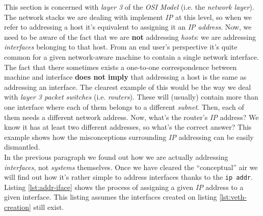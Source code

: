         This section is concerned with \textit{layer 3} of the \textit{OSI Model} (i.e. the \textit{network layer}). The network stacks we are dealing with implement \textit{IP} at this level, so when we refer to addressing a host it's equivalent to assigning it an \textit{IP address}. Now, we need to be aware of the fact that we are \textbf{not} addressing \textit{hosts}: we are addressing \textit{interfaces} belonging to that host. From an end user's perspective it's quite common for a given network-aware machine to contain a single network interface. The fact that there sometimes exists a one-to-one correspondence between machine and interface \textbf{does not imply} that addressing a host is the same as addressing an interface. The clearest example of this would be the way we deal with \textit{layer 3 packet switches} (i.e. \textit{routers}). These will (usually) contain more than one interface where each of them belongs to a different \textit{subnet}. Then, each of them needs a different network address. Now, what's the router's \textit{IP} address? We know it has at least two different addresses, so what's the correct answer? This example shows how the misconceptions surrounding \textit{IP} addressing can be easily dismantled.\\

        In the previous paragraph we found out how we are actually addressing \textit{interfaces}, not \textit{systems} themselves. Once we have cleared the ``conceptual'' air we will find out how it's rather simple to address interfaces thanks to the \texttt{ip addr}. Listing \ref{lst:addr-iface} shows the process of assigning a given \textit{IP} address to a given interface. This listing assumes the interfaces created on listing \ref{lst:veth-creation} still exist.\\

